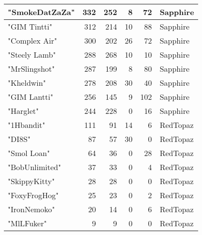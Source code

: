 \documentclass{article}
\begin{document}
\begin{table}[htbp]
\begin{tabular}{|l|r|r|r|r|l|}
"SmokeDatZaZa" & 332 & 252 & 8 & 72 & Sapphire \\ \hline
"GIM Tintti" & 312 & 214 & 10 & 88 & Sapphire \\ \hline
"Complex Air" & 300 & 202 & 26 & 72 & Sapphire \\ \hline
"Steely Lamb" & 288 & 268 & 10 & 10 & Sapphire \\ \hline
"MrSlingshot" & 287 & 199 & 8 & 80 & Sapphire \\ \hline
"Kheldwin" & 278 & 208 & 30 & 40 & Sapphire \\ \hline
"GIM Lantti" & 256 & 145 & 9 & 102 & Sapphire \\ \hline
"Harglet" & 244 & 228 & 0 & 16 & Sapphire \\ \hline
"1Hbandit" & 111 & 91 & 14 & 6 & RedTopaz \\ \hline
"DI8S" & 87 & 57 & 30 & 0 & RedTopaz \\ \hline
"Smol Loan" & 64 & 36 & 0 & 28 & RedTopaz \\ \hline
"BobUnlimited" & 37 & 33 & 0 & 4 & RedTopaz \\ \hline
"SkippyKitty" & 28 & 28 & 0 & 0 & RedTopaz \\ \hline
"FoxyFrogHog" & 25 & 23 & 0 & 2 & RedTopaz \\ \hline
"IronNemoko" & 20 & 14 & 0 & 6 & RedTopaz \\ \hline
"MlLFuker" & 9 & 9 & 0 & 0 & RedTopaz \\ \hline
\end{tabular}
\end{table}
\end{document}
